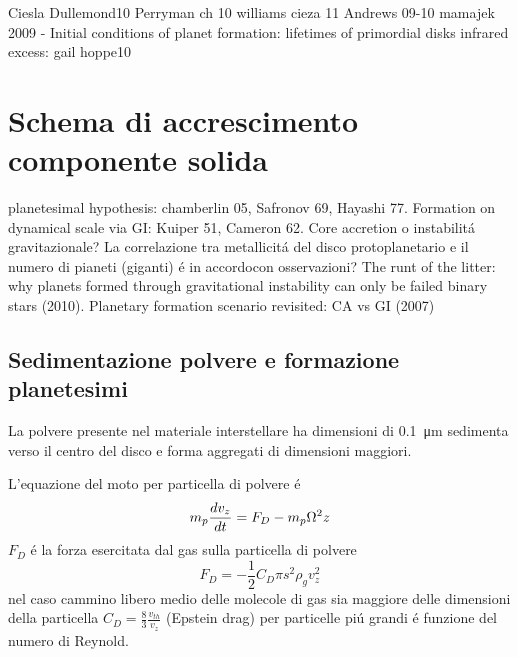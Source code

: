 \begin{workout}
Ciesla Dullemond10 
Perryman ch 10
williams cieza 11
Andrews 09-10
mamajek 2009 - Initial conditions of planet formation: lifetimes of primordial disks
infrared excess: gail hoppe10
\end{workout}

{\let\clearpage\relax\let\cleardoublepage\relax
\chapter{Schema di accrescimento componente solida}
}

\begin{workout}[Refs GI vs CA]
planetesimal hypothesis: chamberlin 05, Safronov 69, Hayashi 77. Formation on dynamical scale via GI: Kuiper 51, Cameron 62.
Core accretion o instabilit\'a gravitazionale?
La correlazione tra metallicit\'a del disco protoplanetario e il numero di pianeti (giganti) \'e in accordocon osservazioni?
The runt of the litter: why planets formed through gravitational instability can only be failed binary stars (2010).
Planetary formation scenario revisited: CA vs GI (2007)
\end{workout}

\begin{workout}

\end{workout}

\section{Sedimentazione polvere e formazione planetesimi}

La polvere presente nel materiale interstellare ha dimensioni di \SI{0.1}{\micro\meter} sedimenta verso il centro del disco e forma aggregati di dimensioni maggiori.

L'equazione del moto per particella di polvere \'e
\begin{equation}\label{eq:motiondust}
m_p\TDy{t}{v_z}=F_D-m_p\Omega^2z
\end{equation}
$F_D$ \'e la forza esercitata dal gas sulla particella di polvere
\begin{equation}
F_D=-\frac{1}{2}C_D\pi s^2\rho_gv^2_z
\end{equation}
nel caso cammino libero medio delle molecole di gas sia maggiore delle dimensioni della particella $C_D=\frac{8}{3}\frac{v_{th}}{v_z}$ (Epstein drag) per particelle pi\'u grandi \'e funzione del numero di Reynold.

